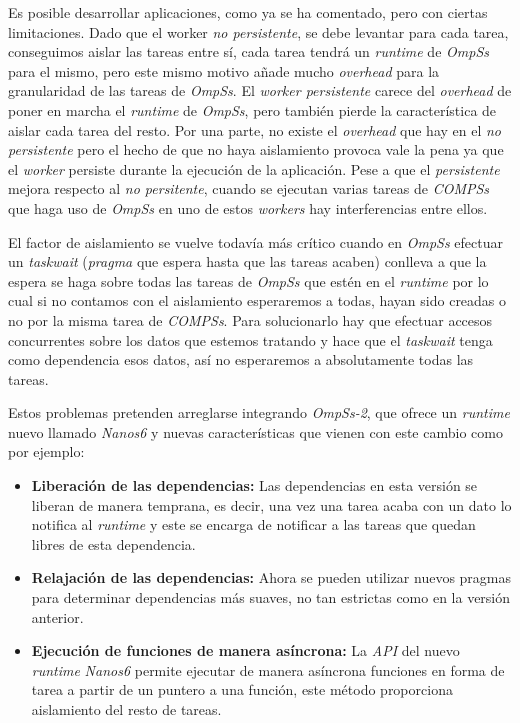 Es posible desarrollar aplicaciones, como ya se ha comentado, pero con ciertas limitaciones. Dado que el worker \textit{no persistente}, se debe levantar para cada tarea, conseguimos aislar las tareas entre sí, cada tarea tendrá un \textit{runtime} de \textit{OmpSs} para el mismo, pero este mismo motivo añade mucho \textit{overhead} para la granularidad de las tareas de \textit{OmpSs}. El \textit{worker persistente} carece del \textit{overhead} de poner en marcha el \textit{runtime} de \textit{OmpSs}, pero también pierde la característica de aislar cada tarea del resto. Por una parte, no existe el \textit{overhead} que hay en el \textit{no persistente} pero el hecho de que no haya aislamiento provoca vale la pena ya que el \textit{worker} persiste durante la ejecución de la aplicación. Pese a que el \textit{persistente} mejora respecto al \textit{no persitente}, cuando se ejecutan varias tareas de \textit{COMPSs} que haga uso de \textit{OmpSs} en uno de estos \textit{workers} hay interferencias entre ellos.
\par\bigskip
El factor de aislamiento se vuelve todavía más crítico cuando en \textit{OmpSs} efectuar un \textit{taskwait} (\textit{pragma} que espera hasta que las tareas acaben) conlleva a que la espera se haga sobre todas las tareas de \textit{OmpSs} que estén en el \textit{runtime} por lo cual si no contamos con el aislamiento esperaremos a todas, hayan sido creadas o no por la misma tarea de \textit{COMPSs}. Para solucionarlo hay que efectuar accesos concurrentes sobre los datos que estemos tratando y hace que el \textit{taskwait} tenga como dependencia esos datos, así no esperaremos a absolutamente todas las tareas.
\par\bigskip
Estos problemas pretenden arreglarse integrando \textit{OmpSs-2}, que ofrece un \textit{runtime} nuevo llamado \textit{Nanos6} y nuevas características que vienen con este cambio como por ejemplo:

\begin{itemize}
\item \textbf{Liberación de las dependencias:} Las dependencias en esta versión se liberan de manera temprana, es decir, una vez una tarea acaba con un dato lo notifica al \textit{runtime} y este se encarga de notificar a las tareas que quedan libres de esta dependencia.
 \item \textbf{Relajación de las dependencias:} Ahora se pueden utilizar nuevos pragmas para determinar dependencias más suaves, no tan estrictas como en la versión anterior.
 \item \textbf{Ejecución de funciones de manera asíncrona:} La \textit{API} del nuevo \textit{runtime} \textit{Nanos6} permite ejecutar de manera asíncrona funciones en forma de tarea a partir de un puntero a una función, este método proporciona aislamiento del resto de tareas.
\end{itemize}

